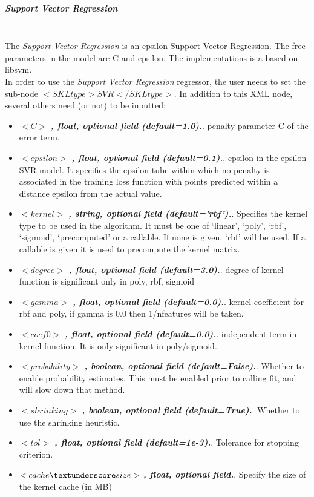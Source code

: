 \subparagraph{Support Vector Regression}
\mbox{}
\\The \textit{Support Vector Regression} is an epsilon-Support Vector Regression.
The free parameters in the model are C and epsilon.
The implementations is a based on libsvm.
\\In order to use the \textit{Support Vector Regression} regressor, the user needs to set the sub-node $<SKLtype>SVR</SKLtype>$.
In addition to this XML node, several others need (or not) to be inputted:
\begin{itemize}
  \item $<C>$ \textbf{\textit{, float, optional field (default=1.0).}}. penalty parameter C of the error term.
  \item $<epsilon>$ \textbf{\textit{, float, optional field (default=0.1).}}. epsilon in the epsilon-SVR model. It specifies the epsilon-tube within which no penalty is associated in the training loss function with points predicted within a distance epsilon from the actual value.
  \item $<kernel>$ \textbf{\textit{, string, optional field (default=’rbf’).}}. Specifies the kernel type to be used in the algorithm. It must be one of ‘linear’, ‘poly’, ‘rbf’, ‘sigmoid’, ‘precomputed’ or a callable. If none is given, ‘rbf’ will be used. If a callable is given it is used to precompute the kernel matrix.
  \item $<degree>$ \textbf{\textit{, float, optional field (default=3.0).}}. degree of kernel function is significant only in poly, rbf, sigmoid
  \item $<gamma>$ \textbf{\textit{, float, optional field (default=0.0).}}. kernel coefficient for rbf and poly, if gamma is 0.0 then 1/n\textunderscore features will be taken.
  \item $<coef0>$ \textbf{\textit{, float, optional field (default=0.0).}}. independent term in kernel function. It is only significant in poly/sigmoid.
  \item $<probability>$ \textbf{\textit{, boolean, optional field (default=False).}}. Whether to enable probability estimates. This must be enabled prior to calling fit, and will slow down that method.
  \item $<shrinking>$ \textbf{\textit{, boolean, optional field (default=True).}}. Whether to use the shrinking heuristic.
  \item $<tol>$ \textbf{\textit{, float, optional field (default=1e-3).}}. Tolerance for stopping criterion.
  \item $<cache\textunderscore size>$ \textbf{\textit{, float, optional field.}}. Specify the size of the kernel cache (in MB)

\end{itemize}
